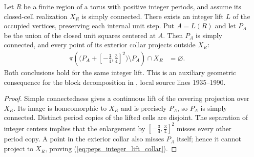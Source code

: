 \begin{lemma}%
    \label{thm:peps_torus_integer_cell_lift}
    \leanok
    Let $R$ be a finite region of a torus with positive integer
    periods, and assume its closed-cell realization $X_R$
    is simply connected. There exists an integer lift $L$ of the
    occupied vertices, preserving each internal unit step. Put
    $A=L(R)$ and let $P_A$ be the union of the closed unit squares
    centered at $A$. Then $P_A$ is simply connected, and every point
    of its exterior collar projects outside $X_R$:
    \begin{align}
        \pi\!\left(\bigl(P_A+[-\tfrac34,\tfrac34]^2\bigr)\setminus P_A\right)
        \cap X_R & =\varnothing.
        \label{eq:peps_integer_lift_collar}
    \end{align}
    Both conclusions hold for the same integer lift. This is an
    auxiliary geometric consequence for the block decomposition in
    \cite[Theorem~6.9]{Schuch2010PEPS}, local source lines 1935--1990.
\end{lemma}

\begin{proof}\leanok
    Simple connectedness gives a continuous lift of the covering
    projection over $X_R$. Its image is homeomorphic to $X_R$ and is
    precisely $P_A$, so $P_A$ is simply connected. Distinct period
    copies of the lifted cells are disjoint. The separation of
    integer centers implies that the enlargement by
    $[-\tfrac34,\tfrac34]^2$ misses every other period copy.
    A point in the exterior collar also misses $P_A$ itself; hence it
    cannot project to $X_R$, proving (\ref{eq:peps_integer_lift_collar}).
\end{proof}
